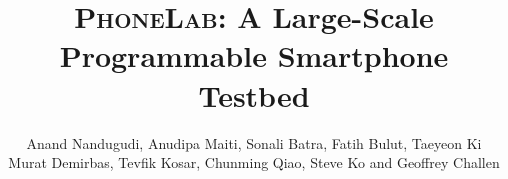 



\title{\textsc{\LARGE PhoneLab}: A Large-Scale Programmable Smartphone
Testbed}


\author{
\alignauthor
Anand Nandugudi, Anudipa Maiti, Sonali Batra, Fatih Bulut, Taeyeon Ki\\
Murat Demirbas, Tevfik Kosar, Chunming Qiao, Steve Ko and Geoffrey
Challen\\[0.1in]
\\
\\
}

\maketitle

\begin{abstract}

\end{abstract}



{\footnotesize


}


